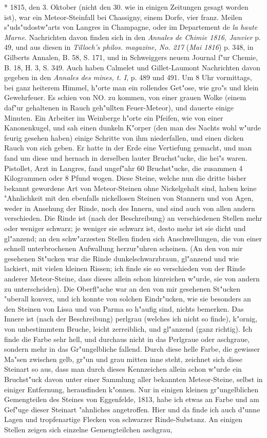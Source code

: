 \documentclass[a4paper, 11pt, oneside, polutonikogreek, german]{article}
\begin{document}
* 1815, den 3. Oktober (nicht den 30. wie in einigen Zeitungen gesagt worden ist), war ein Meteor-Steinfall bei Chassigny, einem Dorfe, vier franz. Meilen s"uds"udostw"arts von Langres in Champagne, oder im Departement de \emph{la haute Marne}. Nachrichten davon finden sich in den \emph{Annales de Chimie 1816, Janvier} p. 49, und aus diesen in \emph{Tilloch's philos. magazine, No. 217} (\emph{Mai 1816}) p. 348, in Gilberts Annalen, B. 58, S. 171, und in Schweiggers neuem Journal f"ur Chemie, B. 18, H. 3, S. 349. Auch haben Calmelet und Gillet-Laumont Nachrichten davon gegeben in den \emph{Annales des mines, t. I}, p. 489 und 491. Um 8 Uhr vormittags, bei ganz heiterem Himmel, h"orte man ein rollendes Get"ose, wie gro"s und klein Gewehrfeuer. Es schien von NO. zu kommen, von einer grauen Wolke (einem daf"ur gehaltenen in Rauch geh"ullten Feuer-Meteor), und dauerte einige Minuten. Ein Arbeiter im Weinberge h"orte ein Pfeifen, wie von einer Kanonenkugel, und sah einen dunkeln K"orper (den man des Nachts wohl w"urde feurig gesehen haben) einige Schritte von ihm niederfallen, und einen dicken Rauch von sich geben. Er hatte in der Erde eine Vertiefung gemacht, und man fand um diese und hernach in derselben lauter Bruchst"ucke, die hei"s waren. Pistollet, Arzt in Langres, fand ungef"ahr 60 Bruchst"ucke, die zusammen 4 Kilogrammen oder 8 Pfund wogen. Diese Steine, welche nun die dritte bisher bekannt gewordene Art von Meteor-Steinen ohne Nickelgehalt sind, haben keine "Ahnlichkeit mit den ebenfalls nickellosen Steinen von Stannern und von Agen, weder in Ansehung der Rinde, noch des Innern, und sind auch von allen andern verschieden. Die Rinde ist (nach der Beschreibung) an verschiedenen Stellen mehr oder weniger schwarz; je weniger sie schwarz ist, desto mehr ist sie dicht und gl"anzend; an den schw"arzesten Stellen finden sich Anschwellungen, die von einer schnell unterbrochenen Aufwallung herzur"uhren scheinen. (An den von mir gesehenen St"ucken war die Rinde dunkelschwarzbraun, gl"anzend und wie lackiert, mit vielen kleinen Rissen; ich finde sie so verschieden von der Rinde anderer Meteor-Steine, dass dieses allein schon hinreichen w"urde, sie von andern zu unterscheiden). Die Oberfl"ache war an den von mir gesehenen St"ucken "uberall konvex, und ich konnte von solchen Eindr"ucken, wie sie besonders an den Steinen von Lissa und von Parma so h"aufig sind, nichts bemerken. Das Innere ist (nach der Beschreibung) perlgrau (welches ich nicht so finde), k"ornig, von unbestimmtem Bruche, leicht zerreiblich, und gl"anzend (ganz richtig). Ich finde die Farbe sehr hell, und durchaus nicht in das Perlgraue oder aschgraue, sondern mehr in das Gr"ungelbliche fallend. Durch diese helle Farbe, die gewisser Ma"sen zwischen gelb, gr"un und grau mitten inne steht, zeichnet sich diese Steinart so aus, dass man durch dieses Kennzeichen allein schon w"urde ein Bruchst"uck davon unter einer Sammlung aller bekannten Meteor-Steine, selbst in einiger Entfernung, herausfinden k"onnen. Nur in einigen kleinen gr"ungelblichen Gemengteilen des Steines von Eggenfelde, 1813, habe ich etwas an Farbe und am Gef"uge dieser Steinart "ahnliches angetroffen. Hier und da finde ich auch d"unne Lagen und tropfenartige Flecken von schwarzer Rinde-Substanz. An einigen Stellen zeigen sich einzelne Gemengteilchen aschgrau, 
\end{document}
